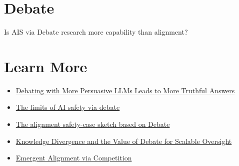 \documentclass[11pt]{article}
\begin{document}
\section{Debate}
\label{sec:closingdebate}

Is AIS via Debate research more capability than alignment?

\section{Learn More}
\label{sec:learnmore}

\begin{itemize}
  \item \href{https://arxiv.org/abs/2402.06782}{Debating with More Persuasive LLMs Leads to More Truthful Answers}
  \item \href{https://www.lesswrong.com/posts/kguLeJTt6LnGuYX4E/the-limits-of-ai-safety-via-debate}{The limits of AI safety via debate}
  \item \href{https://www.aisi.gov.uk/research/an-alignment-safety-case-sketch-based-on-debate}{The alignment safety-case sketch based on Debate}
  \item \href{https://arxiv.org/abs/2603.05293}{Knowledge Divergence and the Value of Debate for Scalable Oversight}
  \item \href{https://arxiv.org/html/2509.15090v2\#abstract}{Emergent Alignment via Competition}
\end{itemize}
\end{document}
